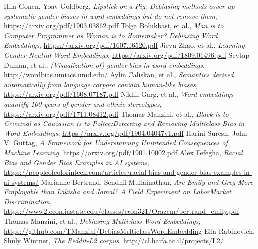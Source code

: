 \documentclass[12pt, a4paper]{article}
\begin{document}
		
	\begin{thebibliography}{10}
		
		 Hila Gonen, Yoav Goldberg, \textit{Lipstick on a Pig: Debiasing methods cover up systematic gender biases in word embeddings but do not remove them}, \url{https://arxiv.org/pdf/1903.03862.pdf}
		 Tolga Bolukbasi, et al., \textit{Man is to Computer Programmer as Woman is to Homemaker? Debiasing Word Embeddings}, \url{https://arxiv.org/pdf/1607.06520.pdf}
		 Jieyu Zhao, et al., \textit{Learning Gender-Neutral Word Embeddings}, \url{https://arxiv.org/pdf/1809.01496.pdf}
		 Sevtap Duman, et al., \textit{(Visualization of) gender bias in word embeddings}, \url{http://wordbias.umiacs.umd.edu/}
		Aylin Caliskan, et al., \textit{Semantics derived automatically from language corpora contain human-like biases}, \url{https://arxiv.org/pdf/1608.07187.pdf}
		Nikhil Garg, et al., \textit{Word embeddings quantify 100 years of gender and ethnic stereotypes}, \url{https://arxiv.org/pdf/1711.08412.pdf}
		 Thomas Manzini, et al., \textit{Black is to Criminal as Caucasian is to Police:Detecting and Removing Multiclass Bias in Word Embeddings}, \url{https://arxiv.org/pdf/1904.04047v1.pdf}
		 Harini Suresh, John V. Guttag, \textit{A Framework for Understanding Unintended Consequences of Machine Learning}, \url{https://arxiv.org/pdf/1901.10002.pdf}
		 Alex Fefegha, \textit{Racial Bias and Gender Bias Examples in AI systems}, \url{https://peopleofcolorintech.com/articles/racial-bias-and-gender-bias-examples-in-ai-systems/}
		Marianne Bertrand, Sendhil Mullainathan, \textit{Are Emily and Greg More Employable than Lakisha and Jamal? A Field Experiment on LaborMarket Discrimination}, \url{https://www2.econ.iastate.edu/classes/econ321/Orazem/bertrand_emily.pdf}
		 Thomas Manzini, et al., \textit{Debiasing Multiclass Word Embeddings}, \url{https://github.com/TManzini/DebiasMulticlassWordEmbedding}
		Ella Rabinovich, Shuly Wintner, \textit{The Reddit-L2 corpus}, \url{http://cl.haifa.ac.il/projects/L2/}
		
	\end{thebibliography}
\end{document}
